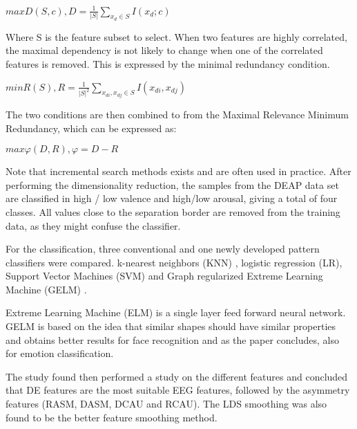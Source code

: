 \begin{center}
$max D(S,c), D=\frac{1}{|S|} {\displaystyle \sum_{x_d \in S}} I(x_d;c)$
\end{center}

Where S is the feature subset to select. When two features are highly correlated, the maximal dependency is not likely to change when one of the correlated features is removed. This is expressed by the minimal redundancy condition.

\begin{center}
$min R(S), R = \frac{1}{|S|^2} {\displaystyle \sum_{x_{di}, x_{dj} \in S}} I(x_{di},x_{dj})$
\end{center}

The two conditions are then combined to from the Maximal Relevance Minimum Redundancy, which can be expressed as:

\begin{center}
$max \varphi(D,R), \varphi=D-R$
\end{center}
Note that incremental search methods exists and are often used in practice. After performing the dimensionality reduction, the samples from the DEAP data set are classified in high / low valence and high/low arousal, giving a total of four classes. All values close to the separation border are removed from the training data, as they might confuse the classifier. 

\npar 

For the classification, three conventional and one newly developed pattern classifiers were compared. k-nearest neighbors (KNN) , logistic regression (LR), Support Vector Machines (SVM) and Graph regularized Extreme Learning Machine (GELM) . 

\npar

Extreme Learning Machine (ELM)  is a single layer feed forward neural network\citep{ELMpaper}. GELM is based on the idea that similar shapes should have similar properties and obtains better results for face recognition \citep{GELMpaper} and as the paper concludes, also for emotion classification.

\npar

The study found then performed a study on the different features and concluded that DE features are the most suitable EEG features, followed by the asymmetry features (RASM, DASM, DCAU and RCAU). The LDS smoothing was also found to be the better feature smoothing method. 


